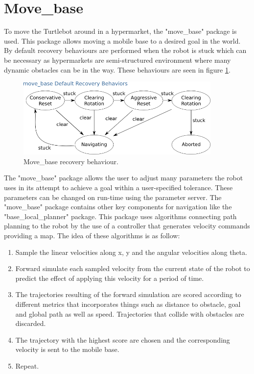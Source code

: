 \section{Move\_base} \label{sec:move_turtlebot}
To move the Turtlebot around in a hypermarket, the "move\_base" package is used. This package allows moving a mobile base to a desired goal in the world. By default recovery behaviours are performed when the robot is stuck which can be necessary as hypermarkets are semi-structured environment where many dynamic obstacles can be in the way. These behaviours are seen in figure \ref{fig:move_base}.\\

\begin{figure}[H]
    \centering
    \includegraphics[width=0.9\textwidth]{figures/recovery_behaviors.png}
    \caption{Move\_base recovery behaviour.}
    \label{fig:move_base}
\end{figure}

The "move\_base" package allows the user to adjust many parameters the robot uses in its attempt to achieve a goal within a user-specified tolerance. These parameters can be changed on run-time using the parameter server. The "move\_base" package contains other key components for navigation like the "base\_local\_planner" package. This package uses algorithms connecting path planning to the robot by the use of a controller that generates velocity commands providing a map. The idea of these algorithms is as follow:

\begin{enumerate}
    \item Sample the linear velocities along x, y and the angular velocities along theta.
    \item Forward simulate each sampled velocity from the current state of the robot to predict the effect of applying this velocity for a period of time.
    \item The trajectories resulting of the forward simulation are scored according to different metrics that incorporates things such as distance to obstacle, goal and global path as well as speed. Trajectories that collide with obstacles are discarded.
    \item The trajectory with the highest score are chosen and the corresponding velocity is sent to the mobile base.
    \item Repeat.
\end{enumerate}

